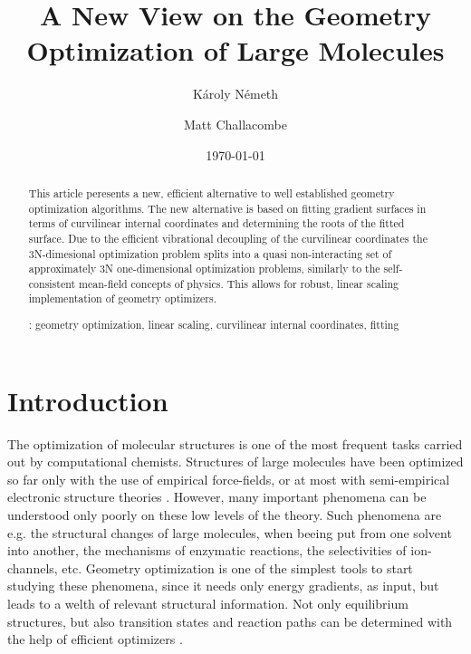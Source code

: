 \documentclass[prl,aps,twocolumn,showpacs,twocolumngrid,superbib]{revtex4}
\begin{document}
\title{
A New View on the Geometry Optimization of Large Molecules\footnotemark[1]}

\author{K\'aroly N\'emeth\footnotemark[2]}
\author{Matt Challacombe}


\date{\today}

\begin{abstract}
{
This article peresents a new, efficient alternative to well established
geometry optimization algorithms. The new alternative is based on
fitting gradient surfaces in terms of curvilinear 
internal coordinates and 
determining the roots of the fitted surface. Due to the efficient 
vibrational decoupling of the curvilinear coordinates the 3N-dimesional
optimization problem splits into a quasi non-interacting
set of approximately 3N one-dimensional optimization problems, 
similarly to the self-consistent mean-field concepts of physics.
This allows for robust, linear scaling implementation of geometry optimizers.
}

\smallskip
{}: 
geometry optimization, linear scaling, 
curvilinear internal coordinates, fitting
\end{abstract}
 

\maketitle


\section{Introduction}
The optimization of molecular structures is one of the most frequent
tasks carried out by computational chemists. 
Structures of large molecules have been optimized so far
only with the use of empirical force-fields, or at most with 
semi-empirical electronic structure theories 
\cite{Stewart_crambin_opt,Schlegel_plasminogen_opt}. However, many important phenomena
can be understood only poorly on these low levels of the theory. 
Such phenomena are e.g. the structural changes of large molecules, 
when beeing put from one solvent into another, the mechanisms of 
enzymatic reactions, the selectivities of ion-channels, etc. 
Geometry optimization is one of the simplest tools to start studying 
these phenomena, since it needs only energy gradients, as input, but 
leads to a welth of relevant structural information.
Not only equilibrium structures, but also transition states and reaction
paths can be determined with the help of efficient optimizers 
\cite{nudged_elastic_band}.
\end{document}

